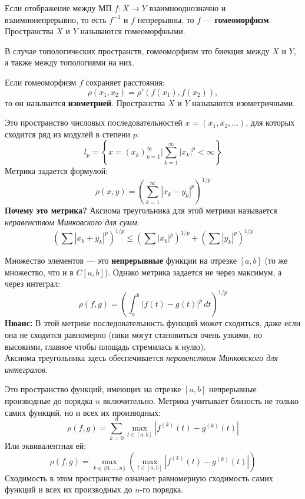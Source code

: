 \begin{definition}[Гомеоморфизм]
	Если отображение между МП $f: X \to Y$ взаимнооднозначно и взаимнонепрерывно, то есть $f^{-1}$ и $f$ непрерывны, то $f$ — \textbf{гомеоморфизм}. Пространства $X$ и $Y$ называются гомеоморфными.
\end{definition}

\begin{remark}
	В случае топологических пространств, гомеоморфизм это биекция между $X$ и $Y$, а также между топологиями на них.
\end{remark}

\begin{definition}[Изометрия]
	Если гомеоморфизм $f$ сохраняет расстояния:
	\[ \rho(x_1, x_2) = \rho'(f(x_1), f(x_2)), \]
	то он называется \textbf{изометрией}. Пространства $X$ и $Y$ называются изометричными.
\end{definition}

\begin{example}
	Это пространство числовых последовательностей $x = (x_1, x_2, \dots)$, для которых сходится ряд из модулей в степени $p$:
	\[ l_p = \left\{ x = (x_k)_{k=1}^\infty \mathrel{\bigg|} \sum_{k=1}^\infty |x_k|^p < \infty \right\} \]
	Метрика задается формулой:
	\[ \rho(x, y) = \left( \sum_{k=1}^\infty |x_k - y_k|^p \right)^{1/p} \]
	\textbf{Почему это метрика?} Аксиома треугольника для этой метрики называется \textit{неравенством Минковского для сумм}:
	\[ \left( \sum |x_k + y_k|^p \right)^{1/p} \leqslant \left( \sum |x_k|^p \right)^{1/p} + \left( \sum |y_k|^p \right)^{1/p} \]
\end{example}

\begin{example}
	Множество элементов — это \textbf{непрерывные} функции на отрезке $[a, b]$ (то же множество, что и в $C[a, b]$).
	Однако метрика задается не через максимум, а через интеграл:
	\[ \rho(f, g) = \left( \int_a^b |f(t) - g(t)|^p \, dt \right)^{1/p} \]
	\textbf{Нюанс:} В этой метрике последовательность функций может сходиться, даже если она не сходится равномерно (пики могут становиться очень узкими, но высокими, главное чтобы площадь стремилась к нулю).
	\\
	Аксиома треугольника здесь обеспечивается \textit{неравенством Минковского для интегралов}.
\end{example}



\begin{example}[Пространство $C^n{[a, b]}$]
	Это пространство функций, имеющих на отрезке $[a, b]$ непрерывные производные до порядка $n$ включительно.
	Метрика учитывает близость не только самих функций, но и всех их производных:
	\[ \rho(f, g) = \sum_{k=0}^n \max_{t \in [a, b]} |f^{(k)}(t) - g^{(k)}(t)| \]
	Или эквивалентная ей:
	\[ \rho(f, g) = \max_{k \in \{0, \dots, n\}} \left( \max_{t \in [a, b]} |f^{(k)}(t) - g^{(k)}(t)| \right) \]
	Сходимость в этом пространстве означает равномерную сходимость самих функций и всех их производных до $n$-го порядка.
\end{example}